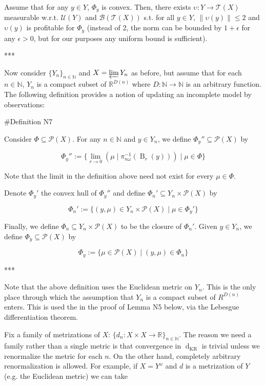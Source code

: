 \documentclass[a4paper]{article}
\newcommand{\Nats}{\mathbb{N}}
\newcommand{\Reals}{\mathbb{R}}
\newcommand{\Norm}[1]{\lVert #1 \rVert}
\newcommand{\Prob}{\mathcal{P}}
\newcommand{\T}{\mathcal{T}}
\newcommand{\B}{\mathcal{B}}
\newcommand{\UM}{\mathcal{U}}
\newcommand{\Dkr}{\operatorname{d}_{\text{KR}}}
\newcommand{\Ball}{\operatorname{B}}
\begin{document}
Assume that for any ${y \in Y}$, ${\Phi_y}$ is convex. Then, there exists ${\upsilon: Y \rightarrow \T(X)}$ measurable w.r.t. ${\UM(Y)}$ and ${\B(\T(X))}$ s.t. for all ${y \in Y}$, ${\Norm{\upsilon(y)} \leq 2}$ and ${\upsilon(y)}$ is profitable for ${\Phi_y}$ (instead of 2, the norm can be bounded by ${1+\epsilon}$ for any ${\epsilon > 0}$, but for our purposes any uniform bound is sufficient).

***

Now consider ${\{Y_n\}_{n \in \Nats}}$ and ${X = \varprojlim Y_n}$ as before, but assume that for each ${n \in \Nats}$, ${Y_n}$ is a compact subset of ${\Reals^{D(n)}}$ where ${D: \Nats \rightarrow \Nats}$ is an arbitrary function. The following definition provides a notion of updating an incomplete model by observations:

\#Definition N7

Consider ${\Phi \subseteq \Prob(X)}$. For any ${n \in \Nats}$ and ${y \in Y_n}$, we define ${\Phi_y'' \subseteq \Prob(X)}$ by

$$\Phi_y'':=\{\lim_{r \rightarrow 0} (\mu \mid \pi_{n\omega}^{-1}(\Ball_r(y))) \mid \mu \in \Phi\}$$

Note that the limit in the definition above need not exist for every ${\mu \in \Phi}$.

Denote ${\Phi_y'}$ the convex hull of ${\Phi_y''}$ and define ${\Phi_n' \subseteq Y_n \times \Prob(X)}$ by

$$\Phi_n':=\{(y,\mu) \in Y_n \times \Prob(X) \mid \mu \in \Phi_y'\}$$

Finally, we define ${\Phi_n \subseteq Y_n \times \Prob(X)}$ to be the closure of ${\Phi_n'}$. Given ${y \in Y_n}$, we define ${\Phi_y \subseteq \Prob(X)}$ by

$$\Phi_y:=\{\mu \in \Prob(X) \mid (y,\mu) \in \Phi_n\}$$

***

Note that the above definition uses the Euclidean metric on ${Y_n}$. This is the only place through which the assumption that ${Y_n}$ is a compact subset of ${R^{D(n)}}$ enters. This is used the in the proof of Lemma N5 below, via the Lebesgue differentiation theorem.

Fix a family of metrizations of ${X}$: ${\{d_n: X \times X \rightarrow \Reals\}_{n \in \Nats}}$. The reason we need a family rather than a single metric is that convergence in ${\Dkr}$ is trivial unless we renormalize the metric for each ${n}$. On the other hand, completely arbitrary renormalization is allowed. For example, if ${X=Y^\omega}$ and ${d}$ is a metrization of ${Y}$ (e.g. the Euclidean metric) we can take 
\end{document}
